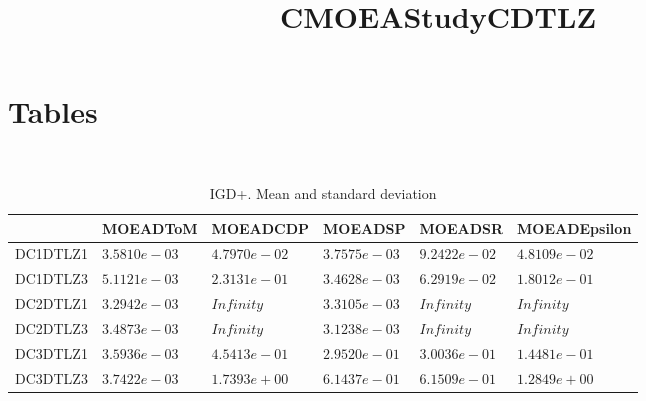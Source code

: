 \documentclass[a3paper]{article}
\title{CMOEAStudyCDTLZ}
\author{}
\begin{document}
\maketitle
\section{Tables}
\
\begin{table*}
\caption{IGD+. Mean and standard deviation}
\label{table:mean.IGD+}
\centering
\begin{tiny}
\begin{tabular}{llllll}
\hline & MOEADToM & MOEADCDP & MOEADSP & MOEADSR &  MOEADEpsilon\\
\hline
DC1DTLZ1 & \cellcolor{gray95}$3.5810e-03$ & $4.7970e-02$ & \cellcolor{gray25}$3.7575e-03$ & $9.2422e-02$ & $4.8109e-02$ \\
DC1DTLZ3 & \cellcolor{gray25}$5.1121e-03$ & $2.3131e-01$ & \cellcolor{gray95}$3.4628e-03$ & $6.2919e-02$ & $1.8012e-01$ \\
DC2DTLZ1 & \cellcolor{gray95}$3.2942e-03$ & $Infinity$ & \cellcolor{gray25}$3.3105e-03$ & $Infinity$ & $Infinity$ \\
DC2DTLZ3 & \cellcolor{gray25}$3.4873e-03$ & $Infinity$ & \cellcolor{gray95}$3.1238e-03$ & $Infinity$ & $Infinity$ \\
DC3DTLZ1 & \cellcolor{gray95}$3.5936e-03$ & $4.5413e-01$ & $2.9520e-01$ & $3.0036e-01$ & \cellcolor{gray25}$1.4481e-01$ \\
DC3DTLZ3 & \cellcolor{gray95}$3.7422e-03$ & $1.7393e+00$ & \cellcolor{gray25}$6.1437e-01$ & $6.1509e-01$ & $1.2849e+00$ \\
\hline
\end{tabular}
\end{tiny}
\end{table*}
\end{document}
